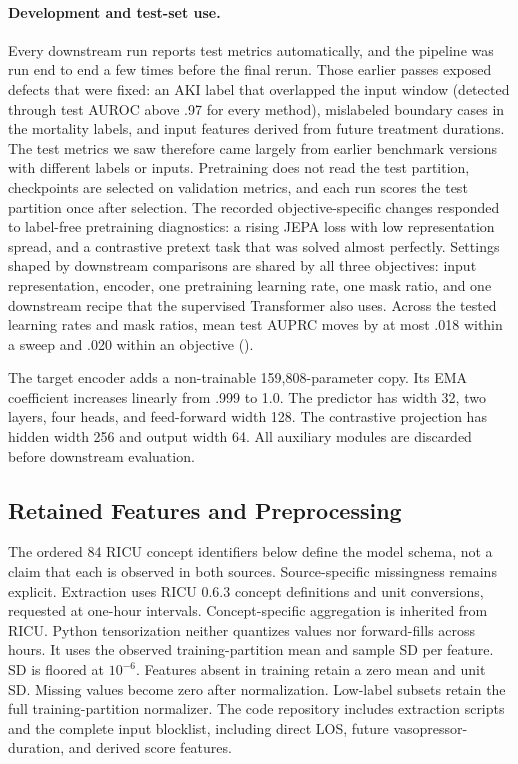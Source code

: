\paragraph{Development and test-set use.}
Every downstream run reports test metrics automatically, and the pipeline was run end to end a few times before the final rerun. Those earlier passes exposed defects that were fixed: an AKI label that overlapped the input window (detected through test AUROC above .97 for every method), mislabeled boundary cases in the mortality labels, and input features derived from future treatment durations. The test metrics we saw therefore came largely from earlier benchmark versions with different labels or inputs. Pretraining does not read the test partition, checkpoints are selected on validation metrics, and each run scores the test partition once after selection. The recorded objective-specific changes responded to label-free pretraining diagnostics: a rising JEPA loss with low representation spread, and a contrastive pretext task that was solved almost perfectly. Settings shaped by downstream comparisons are shared by all three objectives: input representation, encoder, one pretraining learning rate, one mask ratio, and one downstream recipe that the supervised Transformer also uses. Across the tested learning rates and mask ratios, mean test AUPRC moves by at most .018 within a sweep and .020 within an objective ().

The \JEPA{} target encoder adds a non-trainable 159,808-parameter copy. Its EMA coefficient increases linearly from .999 to 1.0. The predictor has width 32, two layers, four heads, and feed-forward width 128. The contrastive projection has hidden width 256 and output width 64. All auxiliary modules are discarded before downstream evaluation.

\subsection{Retained Features and Preprocessing}

The ordered 84 RICU concept identifiers below define the model schema, not a claim that each is observed in both sources. Source-specific missingness remains explicit. Extraction uses RICU 0.6.3 concept definitions and unit conversions, requested at one-hour intervals. Concept-specific aggregation is inherited from RICU. Python tensorization neither quantizes values nor forward-fills across hours. It uses the observed training-partition mean and sample SD per feature. SD is floored at $10^{-6}$. Features absent in training retain a zero mean and unit SD. Missing values become zero after normalization. Low-label subsets retain the full training-partition normalizer. The code repository includes extraction scripts and the complete input blocklist, including direct LOS, future vasopressor-duration, and derived score features.

